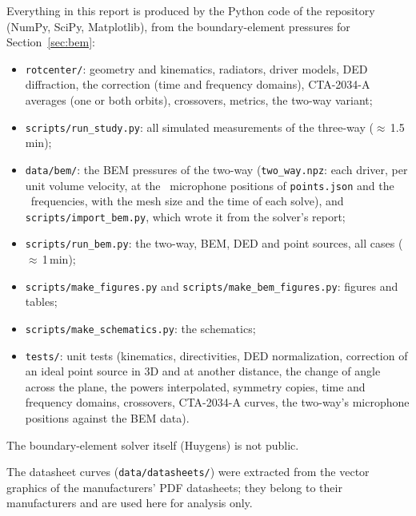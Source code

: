 \documentclass[11pt,a4paper]{article}
\begin{document}
Everything in this report is produced by the Python code of the repository (NumPy, SciPy, Matplotlib),
from the boundary-element pressures for Section~\ref{sec:bem}:
\begin{itemize}
  \item \texttt{rotcenter/}: geometry and kinematics, radiators, driver models, DED diffraction, the
  correction (time and frequency domains), CTA-2034-A averages (one or both orbits), crossovers,
  metrics, the two-way variant;
  \item \texttt{scripts/run\_study.py}: all simulated measurements of the three-way ($\approx$\,1.5\,min);
  \item \texttt{data/bem/}: the BEM pressures of the two-way (\texttt{two\_way.npz}: each driver,
  per unit volume velocity, at the \bemPoints\ microphone positions of \texttt{points.json} and the
  \bemFreqs\ frequencies, with the mesh size and the time of each solve), and \texttt{scripts/import\_bem.py},
  which wrote it from the solver's report;
  \item \texttt{scripts/run\_bem.py}: the two-way, BEM, DED and point sources, all cases ($\approx$\,1\,min);
  \item \texttt{scripts/make\_figures.py} and \texttt{scripts/make\_bem\_figures.py}: figures and
  tables;
  \item \texttt{scripts/make\_schematics.py}: the schematics;
  \item \texttt{tests/}: unit tests (kinematics, directivities, DED normalization, correction of an
  ideal point source in 3D and at another distance, the change of angle across the plane, the powers
  interpolated, symmetry copies, time and frequency domains, crossovers, CTA-2034-A curves, the two-way's
  microphone positions against the BEM data).
\end{itemize}
The boundary-element solver itself (Huygens) is not public.

The datasheet curves (\texttt{data/datasheets/}) were extracted from the vector graphics of the
manufacturers' PDF datasheets; they belong to their manufacturers and are used here for analysis only.
\end{document}
